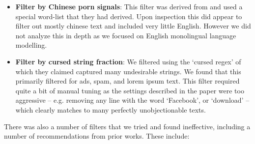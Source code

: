 \documentclass{article}
\begin{document}
\begin{itemize}
    \item \textbf{Filter by Chinese porn signals}: This filter was derived from \citet{kudugunta2024madlad} and used a special word-list that they had derived. Upon inspection this did appear to filter out mostly chinese text and included very little English. However we did not analyze this in depth as we focused on English monolingual language modelling. 
    \item \textbf{Filter by cursed string fraction}: We filtered using the ‘cursed regex’ of \citet{kudugunta2024madlad} which they claimed captured many undesirable strings. We found that this primarily filtered for ads, spam, and lorem ipsum text. This filter required quite a bit of manual tuning as the settings described in the paper were too aggressive – e.g. removing any line with the word ‘Facebook’, or ‘download’ – which clearly matches to many perfectly unobjectionable texts. 
 
\end{itemize}

There was also a number of filters that we tried and found ineffective, including a number of recommendations from prior works. These include:
\end{document}
